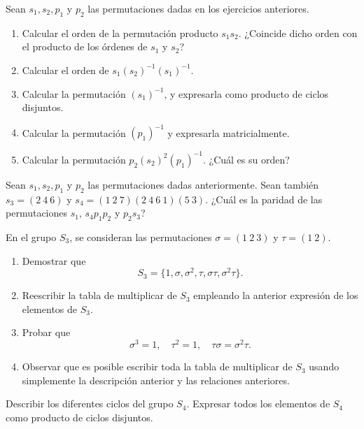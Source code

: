 \begin{ejercicio}\label{ej:2.17}
    Sean $s_1, s_2, p_1$ y $p_2$ las permutaciones dadas en los ejercicios anteriores.
    \begin{enumerate}
        \item Calcular el orden de la permutación producto $s_1s_2$. ¿Coincide dicho orden con el producto de los órdenes de $s_1$ y $s_2$?
        \item Calcular el orden de $s_1(s_2)^{-1}(s_1)^{-1}$.
        \item Calcular la permutación $(s_1)^{-1}$, y expresarla como producto de ciclos disjuntos.
        \item Calcular la permutación $(p_1)^{-1}$ y expresarla matricialmente.
        \item Calcular la permutación $p_2(s_2)^2(p_1)^{-1}$. ¿Cuál es su orden?
    \end{enumerate}
\end{ejercicio}

\begin{ejercicio}\label{ej:2.18}
    Sean $s_1, s_2, p_1$ y $p_2$ las permutaciones dadas anteriormente. Sean también $s_3 = (2\ 4\ 6)$ y $s_4 = (1\ 2\ 7)(2\ 4\ 6\ 1)(5\ 3)$. ¿Cuál es la paridad de las permutaciones $s_1$, $s_4p_1p_2$ y $p_2s_3$?
\end{ejercicio}

\begin{ejercicio}\label{ej:2.19}
    En el grupo $S_3$, se consideran las permutaciones $\sigma = (1\ 2\ 3)$ y $\tau = (1\ 2)$.
    \begin{enumerate}
        \item Demostrar que
        $$S_3 = \{1, \sigma, \sigma^2, \tau, \sigma\tau, \sigma^2\tau\}.$$
        \item Reescribir la tabla de multiplicar de $S_3$ empleando la anterior expresión de los elementos de $S_3$.
        \item Probar que
        $$\sigma^3 = 1, \quad \tau^2 = 1, \quad \tau\sigma = \sigma^2\tau.$$
        \item Observar que es posible escribir toda la tabla de multiplicar de $S_3$ usando simplemente la descripción anterior y las relaciones anteriores.
    \end{enumerate}
\end{ejercicio}

\begin{ejercicio}\label{ej:2.20}
    Describir los diferentes ciclos del grupo $S_4$. Expresar todos los elementos de $S_4$ como producto de ciclos disjuntos.
\end{ejercicio}

